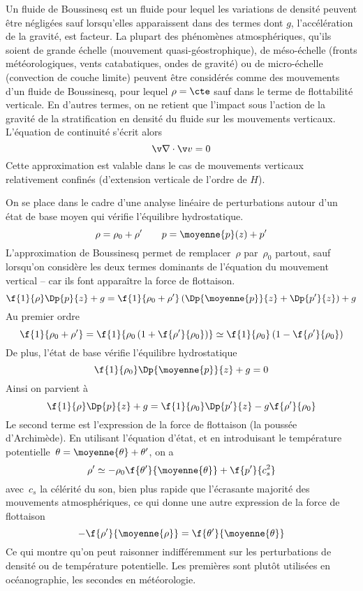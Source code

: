 \sk
Un fluide de Boussinesq est un fluide pour lequel les variations de densité peuvent être négligées 
sauf lorsqu'elles apparaissent dans des termes dont $g$, l'accélération de la gravité, est facteur.
La plupart des phénomènes atmosphériques, 
qu'ils soient de grande échelle (mouvement quasi-géostrophique),
de méso-échelle (fronts météorologiques, vents catabatiques, ondes de gravité)
ou 
de micro-échelle (convection de couche limite)
peuvent être considérés comme des mouvements
d'un fluide de Boussinesq, pour lequel $\rho=\cte$
sauf dans le terme de flottabilité verticale.
En d'autres termes, on ne retient que l'impact sous l'action de la gravité
de la stratification en densité du fluide sur les mouvements verticaux.
L'équation de continuité s'écrit alors
\[ \v \nabla \cdot \v v = 0 \]
\noindent Cette approximation est valable dans le cas de mouvements  
verticaux relativement confinés (d'extension verticale de l'ordre de $H$).

\sk
On se place dans le cadre d'une analyse linéaire de perturbations
autour d'un état de base moyen qui vérifie l'équilibre hydrostatique.
\[ \rho = \rho_0 + \rho' \qquad p = \moyenne{p}(z) + p' \]
L'approximation de Boussinesq permet 
de remplacer~$\rho$ par~$\rho_0$ partout, sauf 
lorsqu'on considère les deux termes dominants 
de l'équation du mouvement vertical -- car ils font apparaître la force de flottaison.
\[ 
\f{1}{\rho} \Dp{p}{z} + g 
= 
\f{1}{\rho_0 + \rho'} \left( \Dp{\moyenne{p}}{z} + \Dp{p'}{z} \right) + g  
\]
\noindent Au premier ordre
\[ 
\f{1}{\rho_0 + \rho'} 
= 
\f{1}{\rho_0 \left( 1 + \f{\rho'}{\rho_0} \right) } 
\simeq 
\f{1}{\rho_0} \left( 1 - \f{\rho'}{\rho_0} \right)
\]
\noindent De plus, l'état de base vérifie l'équilibre hydrostatique
\[ 
\f{1}{\rho_0} \Dp{\moyenne{p}}{z} + g = 0
\]
\noindent Ainsi on parvient à
\[ 
\f{1}{\rho} \Dp{p}{z} + g 
= 
\f{1}{\rho_0} \Dp{p'}{z} - g \f{\rho'}{\rho_0}
\]
\noindent Le second terme est l'expression de la force de flottaison (la poussée d'Archimède).
En utilisant l'équation d'état, et en introduisant le température
potentielle~$\theta = \moyenne{\theta} + \theta'$, on a
\[
\rho' \simeq - \rho_0 \f{\theta'}{\moyenne{\theta}} + \f{p'}{c_s^2}
\]
\noindent avec~$c_s$ la célérité du son, bien plus rapide que
l'écrasante majorité des mouvements atmosphériques, ce qui donne
une autre expression de la force de flottaison
\[
-\f{\rho'}{\moyenne{\rho}} = \f{\theta'}{\moyenne{\theta}}
\]
\noindent Ce qui montre qu'on peut raisonner indifféremment
sur les perturbations de densité ou de température potentielle.
Les premières sont plutôt utilisées en océanographie,
les secondes en météorologie.

